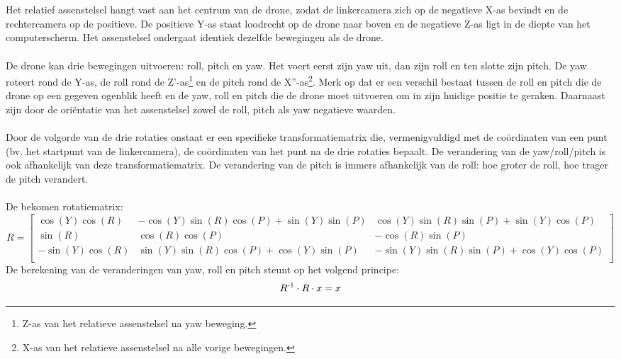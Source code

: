 \\
\\
Het relatief assenstelsel hangt vast aan het centrum van de drone, zodat de linkercamera zich op de negatieve X-as bevindt en de rechtercamera op de positieve. De positieve Y-as staat loodrecht op de drone naar boven en de negatieve Z-as ligt in de diepte van het computerscherm. Het assenstelsel ondergaat identiek dezelfde bewegingen als de drone.
\\
\\
De drone kan drie bewegingen uitvoeren: roll, pitch en yaw. Het voert eerst zijn yaw uit, dan zijn roll en ten slotte zijn pitch. De yaw roteert rond de Y-as, de roll rond de Z'-as\footnote{Z-as van het relatieve assenstelsel na yaw beweging.} en de pitch rond de X''-as\footnote{X-as van het relatieve assenstelsel na alle vorige bewegingen.}. Merk op dat er een verschil bestaat tussen de roll en pitch die de drone op een gegeven ogenblik heeft en de yaw, roll en pitch die de drone moet uitvoeren om in zijn huidige positie te geraken. Daarnaast zijn door de ori\"entatie van het assenstelsel zowel de roll, pitch als yaw negatieve waarden.
\\
\\
Door de volgorde van de drie rotaties onstaat er een specifieke transformatiematrix die, vermenigvuldigd met de coördinaten van een punt (bv. het startpunt van de linkercamera), de coördinaten van het punt na de drie rotaties bepaalt. De verandering van de yaw/roll/pitch is ook afhankelijk van deze transformatiematrix. De verandering van de pitch is immers afhankelijk van de roll: hoe groter de roll, hoe trager de pitch verandert. 
\\
\\
De bekomen rotatiematrix:
\begin{equation*}
R = 
\begin{bmatrix}
\cos(Y)\cos(R) & -\cos(Y)\sin(R)\cos(P) + \sin(Y)\sin(P) & \cos(Y)\sin(R)\sin(P)+\sin(Y)\cos(P) \\
\sin(R) & \cos(R)\cos(P) & -\cos(R)\sin(P) \\ 
-\sin(Y)\cos(R) & \sin(Y)\sin(R)\cos(P)+\cos(Y)\sin(P) & -\sin(Y)\sin(R)\sin(P)+\cos(Y)\cos(P)\\
\end{bmatrix}
\end{equation*}
De berekening van de veranderingen van yaw, roll en pitch steunt op het volgend principe: 
\begin{equation*}
R\textsuperscript{-1} \cdot R \cdot x = x
\end{equation*} 
